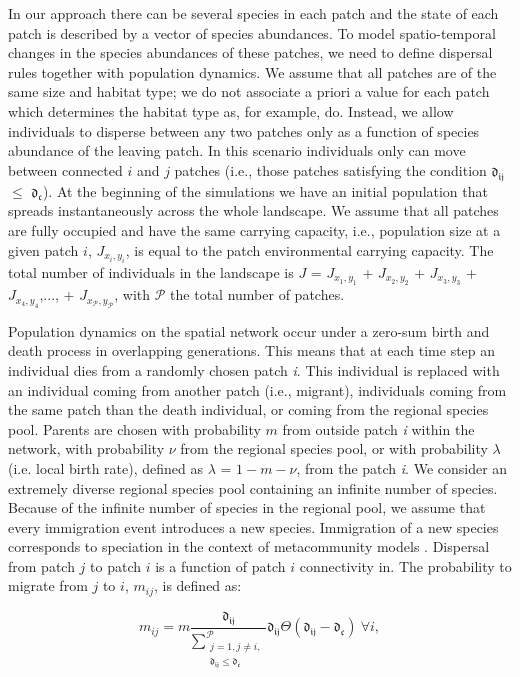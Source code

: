 \documentclass[a4paper,12pt]{article}
\begin{document}
In our approach there can be several species in each patch and the state of each patch is described by a vector of species abundances. To model spatio-temporal changes in the species abundances of these patches, we need to define dispersal rules together with population dynamics. We assume that all patches are of the same size and habitat type; we do not associate a priori a value for each patch which determines the habitat type as, for example, \citep{rybickihanski2013} do. Instead, we allow individuals to disperse between any two patches only as a function of species abundance of the leaving patch. In this scenario individuals only can move between connected $i$ and $j$ patches (i.e., those patches satisfying the condition $\mathfrak{d_{ij}}$ $\leq$ $\mathfrak{d_{c}}$). At the beginning of the simulations we have an initial population that spreads instantaneously across the whole landscape. We assume that all patches are fully occupied and have the same carrying capacity, i.e., population size at a given patch $i$, $J_{x_i,y_i}$, is equal to the patch environmental carrying capacity. The total number of individuals in the landscape is $J$ = $J_{x_1,y_1}$ + $J_{x_2,y_2}$ + $J_{x_3,y_3}$ + $J_{x_4,y_4}$,..., + $J_{x_\mathcal{P},y_\mathcal{P}}$, with $\mathcal{P}$ the total number of patches.

Population dynamics on the spatial network occur under a zero-sum birth and death process in overlapping generations. This means that at each time step an individual dies from a randomly chosen patch {\em i}. This individual is replaced with an individual coming from another patch (i.e., migrant), individuals coming from the same patch than the death individual, or coming from the regional species pool. Parents are chosen with probability $m$ from outside patch {\em i} within the network, with probability $\nu$ from the regional species pool, or with probability $\lambda$ (i.e. local birth rate), defined as $\lambda$ = $1 - m - \nu$, from the patch {\em i}. We consider an extremely diverse regional species pool containing an infinite number of species. Because of the infinite number of species in the regional pool, we assume that every immigration event introduces a new species. Immigration of a new species corresponds to speciation in the context of metacommunity models \citep{Vanpeteghem_Haegeman_2010}. Dispersal from patch $j$ to patch $i$ is a function of patch $i$ connectivity in. The probability to migrate from $j$ to $i$, $m_{ij}$, is defined as:
    
\begin{equation}
m_{ij} = m \frac{\mathfrak{d_{ij}}}{\sum\limits^{\mathcal{P}}_{\substack{j = 1,j \ne i,\\ \mathfrak{d_{ij}} \leq \mathfrak{d_{c}}}}} \mathfrak{d_{ij}} \Theta (\mathfrak{d_{ij}} - \mathfrak{d_{c}}) \ \forall i,
\end{equation}\\
\end{document}
